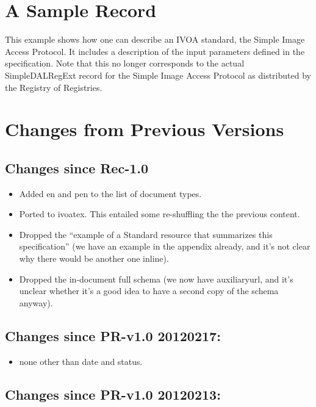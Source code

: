 \documentclass[11pt,a4paper]{ivoa}
\begin{document}
\appendix

\section{A Sample Record}
\label{app:fullrecord}

This example shows how one can describe an IVOA standard, the Simple
Image Access Protocol.  It includes a description of the input parameters
defined in the specification.  Note that this no longer corresponds to
the actual SimpleDALRegExt record for the Simple Image Access Protocol
as distributed by the Registry of Registries.



\section{Changes from Previous Versions}

\subsection{Changes since Rec-1.0}

\begin{itemize}
\item Added en and pen to the list of document types.
\item Ported to ivoatex.  This entailed some re-shuffling the the
previous content.
\item Dropped the ``example of a Standard resource that summarizes this
specification'' (we have an example in the appendix already, and it's
not clear why there would be another one inline).
\item Dropped the in-document full schema (we now have auxiliaryurl, and
it's unclear whether it's a good idea to have a second copy of the
schema anyway).
\end{itemize}

\subsection{Changes since PR-v1.0 20120217:}

\begin{itemize}
\item  none other than date and status.
\end{itemize}

\subsection{Changes since PR-v1.0 20120213:}
\end{document}
